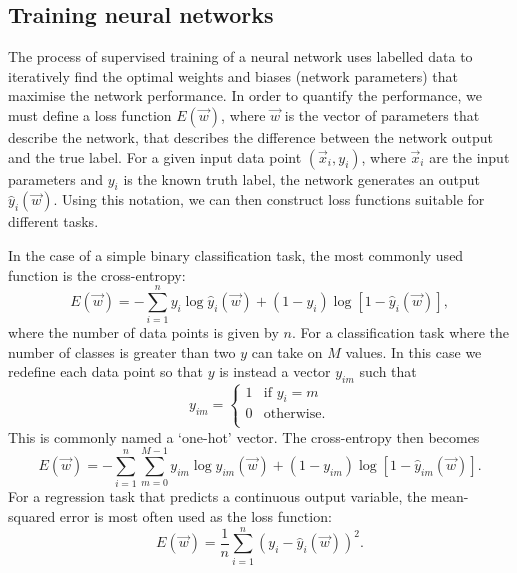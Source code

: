 \subsection{Training neural networks} %
\label{sec:cvn_theory_training} %

The process of supervised training of a neural network uses labelled data to iteratively find the
optimal weights and biases (network parameters) that maximise the network performance. In order to
quantify the performance, we must define a loss function $E(\vec{w})$, where $\vec{w}$ is the
vector of parameters that describe the network, that describes the difference between the network
output and the true label. For a given input data point $(\vec{x}_{i}, y_{i})$, where
$\vec{x}_{i}$ are the input parameters and $y_{i}$ is the known truth label, the network generates
an output $\hat{y}_{i}(\vec{w})$. Using this notation, we can then construct loss functions
suitable for different tasks.

In the case of a simple binary classification task, the most commonly used function is the
cross-entropy:
\begin{equation} %
    E(\vec{w})=
    -\displaystyle\sum_{i=1}^{n}y_{i}\log\hat{y}_{i}(\vec{w})+
    (1-y_{i})\log[1-\hat{y}_{i}(\vec{w})],
    \label{eq:binary_cross_entropy}
\end{equation}
where the number of data points is given by $n$. For a classification task where the number of
classes is greater than two $y$ can take on $M$ values. In this case we redefine each data point
so that $y$ is instead a vector $y_{im}$ such that
\begin{equation} %
    y_{im}=
    \begin{cases}
        1 & \text{if $y_{i}=m$} \\
        0 & \text{otherwise.}   \\
    \end{cases}
\end{equation}
This is commonly named a `one-hot' vector. The cross-entropy then becomes
\begin{equation} %
    E(\vec{w})=
    -\displaystyle\sum_{i=1}^{n}\displaystyle\sum_{m=0}^{M-1}y_{im}\log\hat{y}_{im}
    (\vec{w})+(1-y_{im})\log[1-\hat{y}_{im}(\vec{w})].
    \label{eq:categorical_cross_entropy}
\end{equation}
For a regression task that predicts a continuous output variable, the mean-squared error is most
often used as the loss function:
\begin{equation} %
    E(\vec{w})=
    \frac{1}{n}\displaystyle\sum_{i=1}^{n}(y_{i}-
    \hat{y}_{i}(\vec{w}))^{2}.
    \label{eq:mse}
\end{equation}

